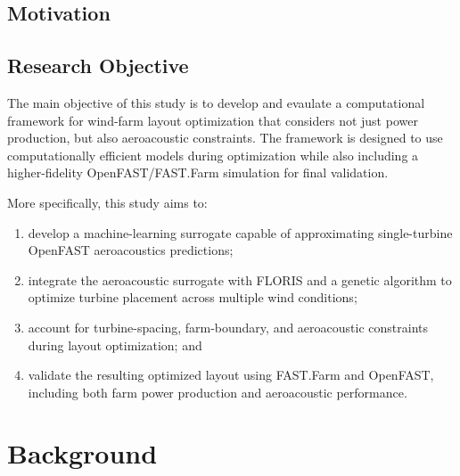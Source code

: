 \documentclass[11pt]{article}
\begin{document}
\lipsum[2]

\subsection{Motivation}

\lipsum[3]

\subsection{Research Objective}

The main objective of this study is to develop and evaulate a computational framework for wind-farm layout optimization that considers not just power production, but also aeroacoustic constraints. The framework is designed to use computationally efficient models during optimization while also including a higher-fidelity OpenFAST/FAST.Farm simulation for final validation.

More specifically, this study aims to:

\begin{enumerate}
    \item develop a machine-learning surrogate capable of approximating single-turbine OpenFAST aeroacoustics predictions;

    \item integrate the aeroacoustic surrogate with FLORIS and a genetic algorithm to optimize turbine placement across multiple wind conditions;

    \item account for turbine-spacing, farm-boundary, and aeroacoustic constraints during layout optimization; and

    \item validate the resulting optimized layout using FAST.Farm and OpenFAST, including both farm power production and aeroacoustic performance.
\end{enumerate}


\section{Background}


\end{document}

